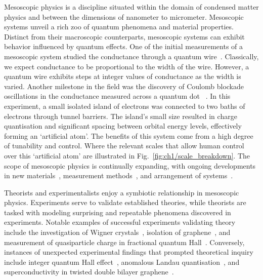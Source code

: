 Mesoscopic physics is a discipline situated within the domain of condensed matter physics and between the dimensions of nanometer to micrometer. Mesoscopic systems unveil a rich zoo of quantum phenomena and material properties. 
Distinct from their macroscopic counterparts, mesoscopic systems can exhibit behavior influenced by quantum effects. One of the initial measurements of a mesoscopic system studied the conductance through a quantum wire~\cite{qpc_first_measurement, qpc_second_measurement}. 
Classically, we expect conductance to be proportional to the width of the wire. 
However, a quantum wire exhibits steps at integer values of conductance as the width is varied. 
Another milestone in the field was the discovery of Coulomb blockade oscillations in the conductance measured across a quantum dot ~\cite{first_charging_of_qd}. 
In this experiment, a small isolated island of electrons was connected to two baths of electrons through tunnel barriers. 
The island's small size resulted in charge quantisation and significant spacing between orbital energy levels, effectively forming an `artificial atom'. 
The benefits of this system come from a high degree of tunability and control. Where the relevant scales that allow human control over this `artificial atom' are illustrated in Fig.~\ref{fig:ch1/scale_breakdown}.
The scope of mesoscopic physics is continually expanding, with ongoing developments in new materials~\cite{manfra_inas}, measurement methods~\cite{child_meas}, and arrangement of systems~\cite{borsoi2022shared, raysu}.

Theorists and experimentalists enjoy a symbiotic relationship in mesoscopic physics. Experiments serve to validate established theories, while theorists are tasked with modeling surprising and repeatable phenomena discovered in experiments. Notable examples of successful experiments validating theory include the investigation of Wigner crystals~\cite{wigner_solid}, isolation of graphene~\cite{graphene}, and measurement of quasiparticle charge in fractional quantum Hall~\cite{fractional_charge}. Conversely, instances of unexpected experimental findings that prompted theoretical inquiry include integer quantum Hall effect~\cite{klitzing}, anomalous Landau quantisation~\cite{landau_quantisation}, and superconductivity in twisted double bilayer graphene~\cite{raysu}.

